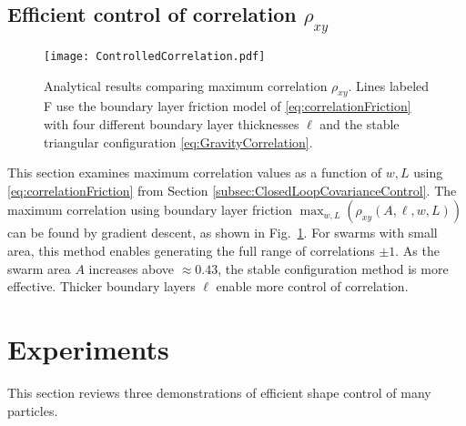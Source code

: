 \subsection{Efficient control of correlation  $\rho_{xy}$}\label{subsec:efficientCorrelation}
\begin{figure}[htb]
\begin{center}
	\texttt{[image: ControlledCorrelation.pdf]}
\end{center}
\vspace{-1em}
\caption{\label{fig:ControlledCorrelation}
Analytical results comparing maximum correlation $\rho_{xy}$. Lines labeled \textsf{F} use the boundary layer friction model of \eqref{eq:correlationFriction} with four different boundary layer thicknesses $\ell$ and the stable triangular configuration \eqref{eq:GravityCorrelation}.
}\end{figure}

This section examines maximum correlation values as a function of  $w,L$ using \eqref{eq:correlationFriction}
from Section  \ref{subsec:ClosedLoopCovarianceControl}. 
The maximum correlation using boundary layer friction $\displaystyle  \max_{w,L} \left( \rho_{xy}(A,\ell,w,L) \right)$ can be found by gradient descent, as shown in Fig.~\ref{fig:ControlledCorrelation}. 
For swarms with small area, this method enables generating the full range of correlations $\pm 1$. %
  As  the swarm area $A$ increases above $\approx 0.43$, the stable configuration method is more effective.
Thicker boundary layers $\ell$ enable more control of correlation.





\section{Experiments}\label{sec:Experiments}
This section reviews three demonstrations of efficient shape control of many particles.
